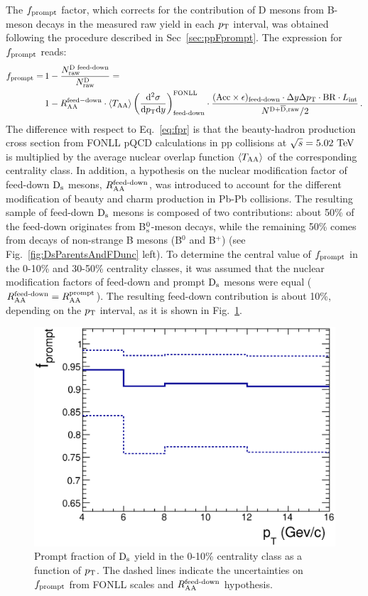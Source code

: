 The $f_{\rm prompt}$ factor, which corrects for the contribution of 
D mesons from B-meson decays in the measured raw yield 
in each $p_{\rm T}$ interval, was obtained following the procedure described in Sec~\ref{sec:ppFprompt}. 
The expression for $f_{\rm prompt}$ reads:
\begin{equation}
\label{eq:fprAA}
\begin{split}
f_{\mathrm{prompt}} = \, & 1- \frac{N^{\text{D~feed-down}}_{\mathrm{raw}}}{N^{\mathrm{D}}_{\mathrm{raw}}}=\\
& 1- R_{\rm AA} ^{\rm feed-down} \cdot  \langle T_{\rm AA} \rangle \left (\frac{\rm d^2 \sigma}{\mathrm dp_{\rm T} \mathrm d y} \right)^{\rm FONLL}_{\text{feed-down}} \cdot  \frac{(\mathrm{Acc} \times \epsilon)_\text{feed-down} \cdot \Delta y \Delta p_{\rm T} \cdot \mathrm{BR} \cdot L_{\rm int}}{N^{\rm D +\overline{D},raw}/2}\,.
\end{split}
\end{equation}
The difference with respect to Eq.~\ref{eq:fpr} is that the beauty-hadron 
production cross section from FONLL pQCD
calculations in pp collisions at $\sqrt{s}=5.02~\mathrm{TeV}$~\cite{Cacciari:2012ny}
is multiplied by the average nuclear overlap function $\langle T_{\rm AA} \rangle$ of the corresponding centrality class. 
In addition, a hypothesis on the nuclear 
modification factor of feed-down ${\rm D_s}$ mesons, $R_{\rm AA}^{\textnormal{feed-down}}$, was 
introduced to account for the different modification of beauty and charm 
production in Pb-Pb collisions. The resulting sample of 
feed-down ${\rm D_s}$ mesons is composed of two 
contributions: about 50\% of the feed-down originates from 
B$^0_{\rm s}$-meson decays, while the remaining 50\% comes from decays of 
non-strange B mesons (B$^0$ and B$^+$) (see Fig.~\ref{fig:DsParentsAndFDunc} left).
To determine the central value of $f_{\rm prompt}$ in the 0-10\% 
and 30-50\% centrality classes, it was assumed that the 
nuclear modification factors of feed-down and prompt ${\rm D_s}$ mesons were equal 
($R_{\rm AA}^{\textnormal{feed-down}}=R_{\rm AA}^{\rm prompt}$). 
The resulting feed-down contribution is about 10\%, depending on the
$p_{\rm T}$ interval, as it is shown in Fig.~\ref{fig:promptAA}.
\begin{figure}[!htb]
 \begin{center}
\includegraphics[width=.54\textwidth]{./FigCap5/fprompt010.eps}
\end{center}
 \caption{Prompt fraction of ${\rm D_s}$ yield in the 0-10\% centrality class as a function of $p_{\rm T}$. The dashed lines indicate the uncertainties on $f_{\rm prompt}$ from FONLL scales and $R_{\rm AA}^{\textnormal{feed-down}}$ hypothesis.}
 \label{fig:promptAA}
\end{figure}
